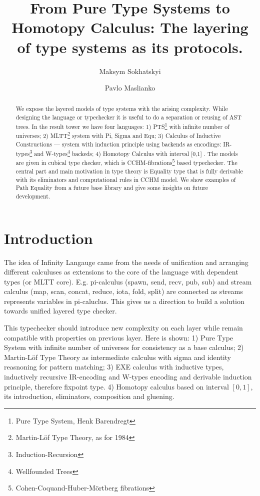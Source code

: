 \documentclass{aip-cp}
\begin{document}
\title{From Pure Type Systems to Homotopy Calculus: The layering of type systems as its protocols.}
\author[aff1]{Maksym Sokhatskyi}
\author[aff1]{Pavlo Maslianko}


\maketitle
\begin{abstract}
We expose the layered models of type systems with the arising complexity.
While designing the language or typechecker it is useful to do a separation or reusing of AST trees.
In the result tower we have four languages: 1) PTS\footnote{Pure Type System, Henk Barendregt} \cite{Erik97} with infinite number of universes;
2) MLTT\footnote{Martin-Löf Type Theory, as for 1984} \cite{Lof84} system with Pi, Sigma and Equ;
3) Calculus of Inductive Constructions \cite{Mohring15} --- system with induction principle using backends as
encodings: IR-types\footnote{Induction-Recursion} \cite{Dagand13} and W-types\footnote{Wellfounded Trees} backeds;
4) Homotopy Calculus with interval [0,1] \cite{Mortberg17}. The models are given in cubical type checker,
which is CCHM-fibrations\footnote{Cohen-Coquand-Huber-Mörtberg fibrations} \cite{Orton17} based typechecker.
The central part and main motivation in type theory is Equality type that is fully
derivable with its eliminators and computational rules in CCHM model. We show examples of
Path Equality from a future base library and give some insights on future development.
\end{abstract}

\section{Introduction}
The idea of Infinity Langauge came from the needs of unification and
arranging different calculuses as extensions to the core of the language
with dependent types (or MLTT core). E.g. pi-calculus (spawn, send, recv, pub, sub)
and stream calculus (map, scan, concat, reduce, iota, fold, split) are connected
as streams represents variables in pi-caluclus. This gives us a direction to build
a solution towards unified layered type checker.

This typechecker should introduce new complexity on each layer while
remain compatible with properties on previous layer. Here is shown:
1) Pure Type System with infinite number of universes for consistency as a base calculus;
2) Martin-Löf Type Theory as intermediate calculus with sigma and identity reasnoning for pattern matching;
3) EXE calculus with inductive types, inductively recursive IR-encoding and W-types encoding and derivable induction principle, therefore fixpoint type.
4) Homotopy calculus based on interval $[0,1]$, its introduction, eliminators, composition and gluening.
\end{document}
